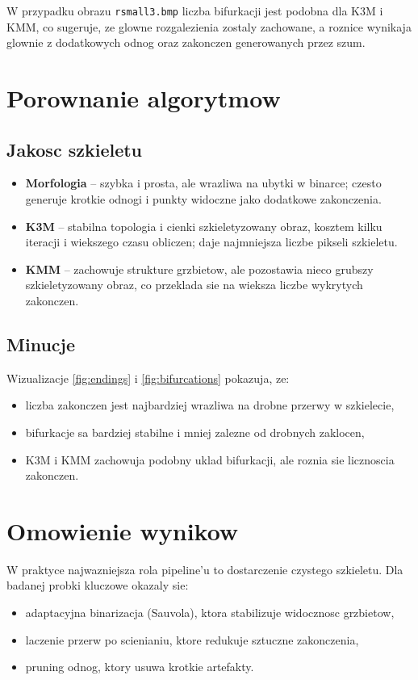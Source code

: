 \documentclass[12pt,a4paper]{article}
\begin{document}
W przypadku obrazu \texttt{rsmall3.bmp} liczba bifurkacji jest podobna dla K3M i KMM, co sugeruje,
ze glowne rozgalezienia zostaly zachowane, a roznice wynikaja glownie z dodatkowych odnog oraz
zakonczen generowanych przez szum.

\section{Porownanie algorytmow}

\subsection{Jakosc szkieletu}

\begin{itemize}
    \item \textbf{Morfologia} -- szybka i prosta, ale wrazliwa na ubytki w binarce; czesto generuje
    krotkie odnogi i punkty widoczne jako dodatkowe zakonczenia.
    \item \textbf{K3M} -- stabilna topologia i cienki szkieletyzowany obraz, kosztem kilku iteracji
    i wiekszego czasu obliczen; daje najmniejsza liczbe pikseli szkieletu.
    \item \textbf{KMM} -- zachowuje strukture grzbietow, ale pozostawia nieco grubszy szkieletyzowany
    obraz, co przeklada sie na wieksza liczbe wykrytych zakonczen.
\end{itemize}

\subsection{Minucje}

Wizualizacje \ref{fig:endings} i \ref{fig:bifurcations} pokazuja, ze:
\begin{itemize}
    \item liczba zakonczen jest najbardziej wrazliwa na drobne przerwy w szkielecie,
    \item bifurkacje sa bardziej stabilne i mniej zalezne od drobnych zaklocen,
    \item K3M i KMM zachowuja podobny uklad bifurkacji, ale roznia sie licznoscia zakonczen.
\end{itemize}

\section{Omowienie wynikow}

W praktyce najwazniejsza rola pipeline'u to dostarczenie czystego szkieletu. Dla badanej probki
kluczowe okazaly sie:
\begin{itemize}
    \item adaptacyjna binarizacja (Sauvola), ktora stabilizuje widocznosc grzbietow,
    \item laczenie przerw po scienianiu, ktore redukuje sztuczne zakonczenia,
    \item pruning odnog, ktory usuwa krotkie artefakty.
\end{itemize}
\end{document}
